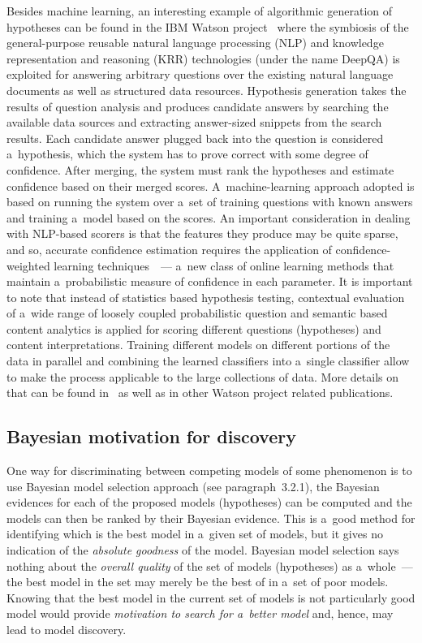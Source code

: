 \begin{multicols}{2}
  Besides machine learning, an interesting example of algorithmic generation of hypotheses can be found in the IBM Watson project~\cite{39-kl} where the
symbiosis of the  general-purpose reusable natural language processing (NLP) and knowledge representation and reasoning (KRR) technologies (under the name
DeepQA) is exploited for answering arbitrary questions over the existing natural language documents as well as structured data resources. Hypothesis generation takes the results of question analysis and produces candidate answers by searching the available data sources and extracting answer-sized snippets from the search results.
Each candidate answer plugged back into the question is considered a~hypothesis, which the system has to prove correct with some degree of confidence. After
merging, the system must rank the hypotheses and estimate confidence based on their merged scores.
A~machine-learning approach adopted is based on running the system over a~set of training questions with known answers and training a~model based on the scores. An important consideration in dealing with NLP-based scorers is that the
features they produce may be quite sparse, and so, accurate confidence estimation requires the application of confidence-weighted learning techniques~\cite{39-kl}~---
a~new class of online learning methods that maintain a~probabilistic measure of confidence in each parameter. It is important to note that instead of statistics based hypothesis testing, contextual evaluation of a~wide range of loosely coupled
probabilistic question and semantic based content analytics is applied for scoring different questions (hypotheses) and content interpretations. Training different
models on different portions of the data in parallel and combining the learned classifiers into a~single classifier
allow to make the process applicable to the large collections of data. More details on that can be found
in~\cite{39-kl, 40-kl} as well as in other Watson project related publications.
{

}

\subsection{Bayesian motivation for discovery }

\noindent
  One way for discriminating between competing models of some phenomenon is to use Bayesian model selection approach
  (see paragraph~3.2.1), the Bayesian evidences for each of
the proposed models (hypotheses) can be computed and the models can then be
ranked by their Bayesian evidence. This is a~good method for identifying which is the best model in a~given set of models, but it gives no indication of the \textit{absolute
goodness} of the model. Bayesian model selection says nothing about the
\textit{overall quality} of the set of models (hypotheses) as a~whole~---
the best model in the set may merely be the best of in a~set of poor models.
Knowing that the best model in the current set of models is not particularly
good model would provide \textit{motivation to search for a~better model} and,
hence, may lead to model discovery.


\end{multicols}
